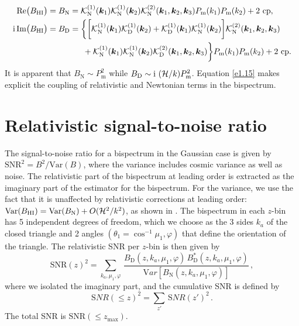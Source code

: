 \begin{itemize}
\begin{align}
\mathrm{Re}\big(B_{{\mathrm{HI}}}\big) &= B_{\mathrm{N}} = \mathcal{K}^{(1)}_{\mathrm{N}}(\bm{k}_{1})\mathcal{K}^{(1)}_{\mathrm{N}}(\bm{k}_{2})\mathcal{K}^{(2)}_{\mathrm{N}}(\bm{k}_{1}, \bm{k}_{2}, \bm{k}_{3})P_{\mathrm{m}} (k_{1})P_{\mathrm{m}} (k_{2}) + \text{2 cp}, \label{e1.14}\\
{\mathrm{i \,Im}}\big(B_{{\mathrm{HI}}}\big) &= B_{\mathrm{D}}= \bigg\{\bigg[\mathcal{K}^{(1)}_{\mathrm{N}}(\bm{k}_{1})\mathcal{K}^{(1)}_{\mathrm{D}}(\bm{k}_{2}) + \mathcal{K}^{(1)}_{\mathrm{D}}(\bm{k}_{1})\mathcal{K}^{(1)}_{\mathrm{N}}(\bm{k}_{2})\bigg]\mathcal{K}^{(2)}_{\mathrm{N}}(\bm{k}_{1},\bm{k}_{2},\bm{k}_{3}) 
\label{e1.15}\\ \nonumber 
& ~~~~~~~~~~~~~ +\mathcal{K}^{(1)}_{\mathrm{N}}(\bm{k}_{1})\mathcal{K}^{(1)}_{\mathrm{N}}(\bm{k}_{2})\mathcal{K}^{(2)}_{\mathrm{D}}(\bm{k}_{1},\bm{k}_{2},\bm{k}_{3})\bigg\}P_{\mathrm{m}} (k_{1})P_{\mathrm{m}} (k_{2})+\text{2 cp}.
\end{align}
It is apparent that {$B_{\mathrm{N}} \sim P_{\mathrm{m}} ^2$ while $B_{\mathrm{D}} \sim {\mathrm{i\,}}\, (\mathcal{H}/k) P_{\mathrm{m}} ^2$.}
Equation \eqref{e1.15} makes explicit the coupling of relativistic  and Newtonian terms in the bispectrum.
\end{itemize}
%
%
%
%
\section{Relativistic signal-to-noise ratio}
%
{The signal-to-noise ratio for a bispectrum in the Gaussian case is given by 
$\mathrm{SNR}^2 = {B^2 / \mathrm{Var}(B)}$, where the variance includes cosmic variance as well as noise.
The relativistic part of the bispectrum at leading order is extracted as the imaginary part of the estimator for the bispectrum. For the variance, we use the fact that it is unaffected by relativistic corrections at leading order: $\mathrm{Var}(B_{{\mathrm{HI}}})= \mathrm{Var}(B_{\mathrm N})+O(\mathcal{H}^2/k^2)$, as shown in \cite{Maartens:2019yhx}.}
%
The bispectrum in each $z$-bin has 5 independent degrees of freedom, which we choose as the 3 sides $k_a$ of the closed triangle and 2 angles $(\theta_1=\cos^{-1}\mu_1,\varphi)$
that define the orientation of the triangle.
The relativistic SNR per $z$-bin is then given by  \cite{Maartens:2019yhx}
\begin{equation}
{{\mathrm{SNR}}(z)^2 =
\sum_{k_a,\mu_1,\varphi}\,\frac{B_{\mathrm D}(z, k_{a},  \mu_{1},\varphi) \,B_{\mathrm D}^*(z, k_{a},  \mu_{1},\varphi)}{{\mathrm Var} [{B_{\mathrm N}}(z, k_a,\mu_{1},\varphi)]}\,,} \label{e2.2_0}
\end{equation}
where we isolated the imaginary part, 
and the cumulative SNR is defined by
\begin{equation}
{{\mathrm SNR}(\leq z)^2 =
\sum_{z'}\,{\mathrm SNR}(z')^2\,.} \label{csnr_d2ß}
\end{equation}
The total SNR is  $\mathrm{SNR}(\le z_\mathrm{max})$.


